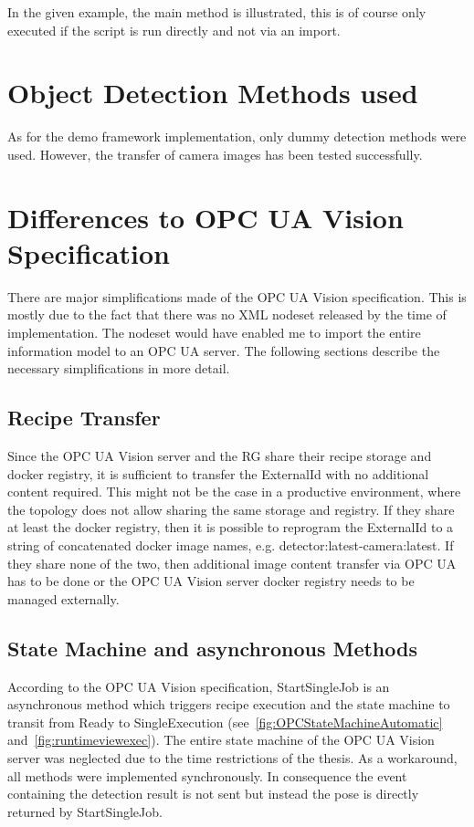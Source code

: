 In the given example, the main method is illustrated, this is of course only executed if the script is run directly and not via an import.

\section{Object Detection Methods used}
As for the demo framework implementation, only dummy detection methods were used. However, the transfer of camera images has been tested successfully.

\section{Differences to OPC UA Vision Specification}
There are major simplifications made of the OPC UA Vision specification. This is mostly due to the fact that there was no XML nodeset released by the time of implementation. The nodeset would have enabled me to import the entire information model to an OPC UA server. The following sections describe the necessary simplifications in more detail.

\subsection{Recipe Transfer}
Since the OPC UA Vision server and the RG share their recipe storage and docker registry, it is sufficient to transfer the ExternalId with no additional content required. This might not be the case in a productive environment, where the topology does not allow sharing the same storage and registry. If they share at least the docker registry, then it is possible to reprogram the ExternalId to a string of concatenated docker image names, e.g. detector:latest-camera:latest. If they share none of the two, then additional image content transfer via OPC UA has to be done or the OPC UA Vision server docker registry needs to be managed externally.

\subsection{State Machine and asynchronous Methods}
According to the OPC UA Vision specification, StartSingleJob is an asynchronous method which triggers recipe execution and the state machine to transit from Ready to SingleExecution (see~\ref{fig:OPCStateMachineAutomatic} and~\ref{fig:runtimeviewexec}). The entire state machine of the OPC UA Vision server was neglected due to the time restrictions of the thesis. As a workaround, all methods were implemented synchronously. In consequence the event containing the detection result is not sent but instead the pose is directly returned by StartSingleJob.


